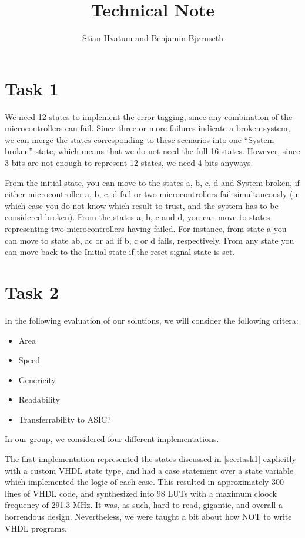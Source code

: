 \documentclass[11pt]{article}
\title{Technical Note}
\author{Stian Hvatum and Benjamin Bjørnseth}
\begin{document}
\maketitle

\section{Task 1}
\label{sec:task1}
We need 12 states to implement the error tagging, since any
combination of the microcontrollers can fail. Since three or more
failures indicate a broken system, we can merge the states
corresponding to these scenarios into one ``System broken'' state,
which means that we do not need the full 16 states. However, since 3
bits are not enough to represent 12 states, we need 4 bits anyways.

From the initial state, you can move to the states a, b, c, d and
System broken, if either microcontroller a, b, c, d fail or two
microcontrollers fail simultaneously (in which case you do not know
which result to trust, and the system has to be considered
broken). From the states a, b, c and d, you can move to states
representing two microcontrollers having failed. For instance, from
state a you can move to state ab, ac or ad if b, c or d fails,
respectively. From any state you can move back to the Initial state if
the reset signal state is set.

\section{Task 2}
\label{sec:task2}

In the following evaluation of our solutions, we will consider the
following critera:
\begin{itemize}

\item Area
\item Speed
\item Genericity
\item Readability
\item Transferrability to ASIC?

\end{itemize}

In our group, we considered four different implementations. 

The first implementation represented the states discussed in
\autoref{sec:task1} explicitly with a custom VHDL state type, and had
a case statement over a state variable which implemented the logic of
each case. This resulted in approximately 300 lines of VHDL code, and
synthesized into 98 LUTs with a maximum cloock frequency of 291.3
MHz. It was, as such, hard to read, gigantic, and overall a horrendous
design. Nevertheless, we were taught a bit about how NOT to write VHDL
programs.
\end{document}
